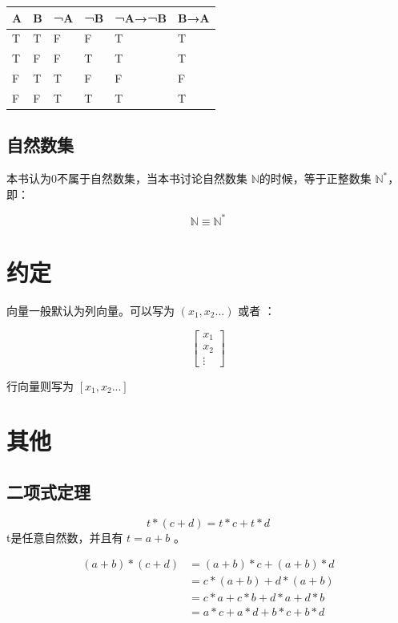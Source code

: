 \documentclass[12pt,oneside]{book}
\begin{document}
\begin{table}[H]
\begin{tabular}{@{}llllll@{}}
\toprule
{A} & {B} & {¬A} & {¬B} & {¬A→¬B} & {B→A} \\ \midrule

{T}          & {T} & {F}  & {F}  & {T}     & {T}   \\
\rowcolor[HTML]{FFFFFF} 
{T}          & {F} & {F}  & {T}  & {T}     & {T}   \\
\rowcolor[HTML]{FFFFFF} 
{F}          & {T} & {T}  & {F}  & {F}     & {F}   \\
\rowcolor[HTML]{FFFFFF} 
{F}          & {F} & {T}  & {T}  & {T}     & {T}   \\ \bottomrule
\end{tabular}
\end{table}


\section{自然数集}
本书认为0不属于自然数集，当本书讨论自然数集 $ \mathbb{N} $的时候，等于正整数集 $\mathbb{N}^{*}$，即：

\[
\mathbb{N} \equiv \mathbb{N}^{*}
\]


\chapter{约定}
向量一般默认为列向量。可以写为 $(x_1, x_2...)$ 或者 ：

\[
\begin{bmatrix}x_{1}  \\ x_2 \\ \vdots \end{bmatrix}
\]

行向量则写为 $[x_1, x_2...]$


\chapter{其他}

\section{二项式定理}
\begin{equation*}
t*(c + d) = t*c + t*d
\end{equation*}
t是任意自然数，并且有 $t=a+b$ 。

\begin{align*}
(a+b)*(c + d) &= (a+b)*c + (a+b)*d\\
                    &=c*(a+b) + d*(a+b)\\
                    &=c*a + c* b + d*a + d*b\\
                    &=a*c + a*d + b*c + b*d
\end{align*}
\end{document}
